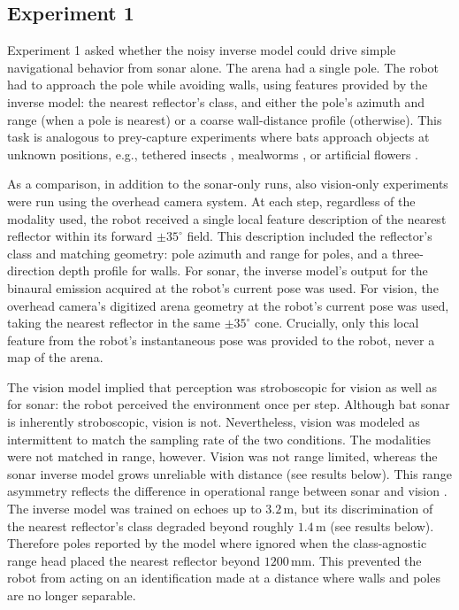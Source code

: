 \documentclass[11pt]{article}
\newcommand{\dgm}{^{\circ}}
\begin{document}
\subsection{Experiment 1}

Experiment 1 asked whether the noisy inverse model could drive simple navigational behavior from sonar alone. The arena had a single pole. The robot had to approach the pole while avoiding walls, using features provided by the inverse model: the nearest reflector's class, and either the pole's azimuth and range (when a pole is nearest) or a coarse wall-distance profile (otherwise). This task is analogous to prey-capture experiments where bats approach objects at unknown positions, e.g., tethered insects \citep{Ghose2003}, mealworms \citep{Falk2014}, or artificial flowers \citep{Simon2011}.

As a comparison, in addition to the sonar-only runs, also vision-only experiments were run using the overhead camera system. At each step, regardless of the modality used, the robot received a single local feature description of the nearest reflector within its forward $\pm 35\dgm$ field. This description included the reflector's class and matching geometry: pole azimuth and range for poles, and a three-direction depth profile for walls. For sonar, the inverse model's output for the binaural emission acquired at the robot's current pose was used. For vision, the overhead camera's digitized arena geometry at the robot's current pose was used, taking the nearest reflector in the same $\pm 35\dgm$ cone. Crucially, only this local feature from the robot's instantaneous pose was provided to the robot, never a map of the arena. %

The vision model implied that perception was stroboscopic for vision as well as for sonar: the robot perceived the environment once per step. Although bat sonar is inherently stroboscopic, vision is not. Nevertheless, vision was modeled as intermittent to match the sampling rate of the two conditions. The modalities were not matched in range, however. Vision was not range limited, whereas the sonar inverse model grows unreliable with distance (see results below). This range asymmetry reflects the difference in operational range between sonar and vision \citep{Boonman2013}. The inverse model was trained on echoes up to $3.2$\,m, but its discrimination of the nearest reflector's class degraded beyond roughly $1.4$\,m (see results below). Therefore poles reported by the model where ignored when the class-agnostic range head placed the nearest reflector beyond $1200$\,mm. This prevented the robot from acting on an identification made at a distance where walls and poles are no longer separable. %
\end{document}
